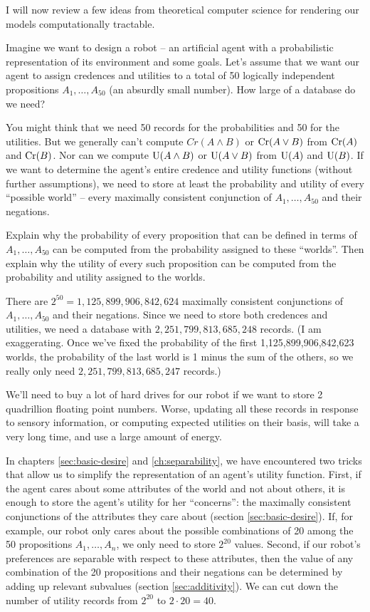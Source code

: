 I will now review a few ideas from theoretical computer science for rendering
our models computationally tractable.

Imagine we want to design a robot -- an artificial agent with a probabilistic
representation of its environment and some goals. Let's assume that we want our
agent to assign credences and utilities to a total of 50 logically independent
propositions $A_1,\ldots,A_{50}$ (an absurdly small number). How large of a
database do we need?

You might think that we need 50 records for the probabilities and 50 for the
utilities. But we generally can't compute $Cr(A \land B)$ or $\text{Cr}(A \lor B)$
from $\text{Cr}(A)$ and $\text{Cr}(B)$. Nor can we compute $\text{U}(A \land B)$ or $\text{U}(A \lor B)$
from $\text{U}(A)$ and $\text{U}(B)$. If we want to determine the agent's entire credence
and utility functions (without further assumptions), we need to store at least
the probability and utility of every ``possible world'' -- every maximally
consistent conjunction of $A_1,\ldots,A_{50}$ and their negations.

\begin{exercise}{3}
  Explain why the probability of every proposition that can be defined in terms
  of $A_1,\ldots,A_{50}$ can be computed from the probability assigned to these
  ``worlds''. Then explain why the utility of every such proposition can be
  computed from the probability and utility assigned to the worlds.
\end{exercise}

There are $2^{50} = 1,125,899,906,842,624$ maximally consistent conjunctions of
$A_1,\ldots,A_{50}$ and their negations. Since we need to store both credences
and utilities, we need a database with $2,251,799,813,685,248$ records. (I am
exaggerating. Once we've fixed the probability of the first
1,125,899,906,842,623 worlds, the probability of the last world is 1 minus the
sum of the others, so we really only need $2,251,799,813,685,247$ records.)

We'll need to buy a lot of hard drives for our robot if we want to store 2
quadrillion floating point numbers. Worse, updating all these records in
response to sensory information, or computing expected utilities on their basis,
will take a very long time, and use a large amount of energy.

In chapters \ref{sec:basic-desire} and \ref{ch:separability}, we have
encountered two tricks that allow us to simplify the representation of an
agent's utility function. First, if the agent cares about some attributes of the
world and not about others, it is enough to store the agent's utility for her
``concerns'': the maximally consistent conjunctions of the attributes they care
about (section \ref{sec:basic-desire}). If, for example, our robot only cares
about the possible combinations of 20 among the 50 propositions
$A_1,\ldots,A_n$, we only need to store $2^{20}$ values. Second, if our robot's
preferences are separable with respect to these attributes, then the value of
any combination of the 20 propositions and their negations can be determined by
adding up relevant subvalues (section \ref{sec:additivity}). We can cut down
the number of utility records from $2^{20}$ to $2 \cdot 20 = 40$.

